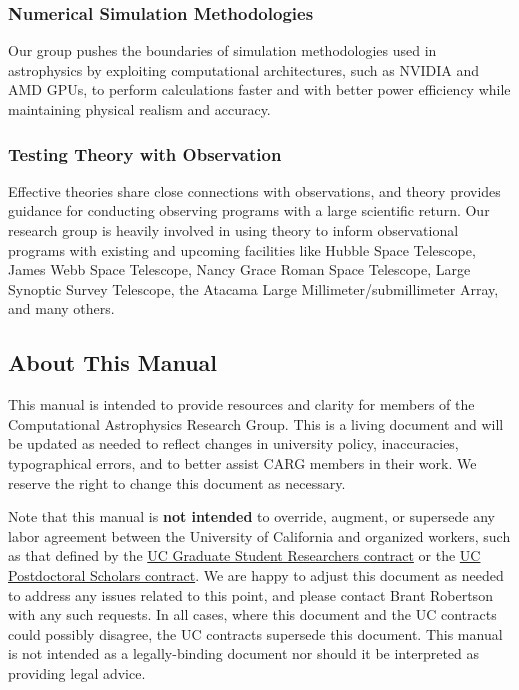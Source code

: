 \subsubsection{Numerical Simulation Methodologies}
Our group pushes the boundaries of simulation methodologies used in astrophysics by exploiting computational architectures, such as NVIDIA and AMD GPUs, to perform calculations faster and with better power efficiency while maintaining physical realism and accuracy.

\subsubsection{Testing Theory with Observation}
Effective theories share close connections with observations, and theory provides guidance for conducting observing programs with a large scientific return. Our research group is heavily involved in using theory to inform observational programs with existing and upcoming facilities like Hubble Space Telescope, James Webb Space Telescope, Nancy Grace Roman Space Telescope, Large Synoptic Survey Telescope, the Atacama Large Millimeter/submillimeter Array, and many others.

\subsection{About This Manual}

This manual is intended to provide resources and clarity for members of the Computational Astrophysics Research Group. This is a living document and will be updated as needed to reflect changes in university policy, inaccuracies, typographical errors, and to better assist CARG members in their work. We reserve
the right to change this document as necessary.

Note that this manual is {\bf not intended} to override, augment,
 or supersede any labor agreement between the University
of California and organized workers, such as that defined by the \href{https://ucnet.universityofcalifornia.edu/resources/employment-policies-contracts/bargaining-units/graduate-student-researchers/contract/}{UC Graduate Student Researchers contract} or the
\href{https://ucnet.universityofcalifornia.edu/resources/employment-policies-contracts/bargaining-units/postdoctoral-scholars/contract/}{UC Postdoctoral Scholars contract}. We are happy to
adjust this document as needed to address any issues related to this point, and please contact
Brant Robertson with any such requests. In all cases, where this document and the UC contracts
could possibly disagree, the UC contracts supersede this document. This manual is not intended as a legally-binding document nor should it be interpreted as providing legal advice.
